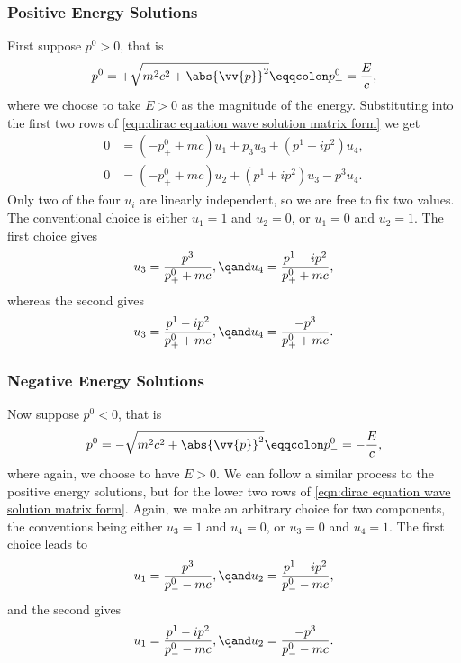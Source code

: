 \documentclass[fleqn]{NotesClass}
\begin{document}
\begin{appendices}
        \subsubsection{Positive Energy Solutions}
        First suppose \(p^0 > 0\), that is
        \begin{equation}
            p^0 = +\sqrt{m^2c^2 + \abs{\vv{p}}^2} \eqqcolon p^0_+ = \frac{E}{c},
        \end{equation}
        where we choose to take \(E > 0\) as the magnitude of the energy.
        Substituting into the first two rows of \cref{eqn:dirac equation wave solution matrix form} we get
        \begin{align}
            0 &= (-p_+^0 + mc)u_1 + p_3u_3 + (p^1 - ip^2)u_4,\\
            0 &= (-p_+^0 + mc)u_2 + (p^1 + ip^2)u_3 - p^3 u_4.
        \end{align}
        Only two of the four \(u_i\) are linearly independent, so we are free to fix two values.
        The conventional choice is either \(u_1 = 1\) and \(u_2 = 0\), or \(u_1 = 0\) and \(u_2 = 1\).
        The first choice gives
        \begin{equation}
            u_3 = \frac{p^3}{p_+^0 + mc}, \qand u_4 = \frac{p^1 + ip^2}{p_+^0 + mc},
        \end{equation}
        whereas the second gives
        \begin{equation}
            u_3 = \frac{p^1 - ip^2}{p_+^0 + mc}, \qand u_4 = \frac{-p^3}{p_+^0 + mc}.
        \end{equation}
        
        \subsubsection{Negative Energy Solutions}
        Now suppose \(p^0 < 0\), that is
        \begin{equation}
            p^0 = -\sqrt{m^2c^2 + \abs{\vv{p}}^2} \eqqcolon p^0_- = -\frac{E}{c},
        \end{equation}
        where again, we choose to have \(E > 0\).
        We can follow a similar process to the positive energy solutions, but for the lower two rows of \cref{eqn:dirac equation wave solution matrix form}.
        Again, we make an arbitrary choice for two components, the conventions being either \(u_3 = 1\) and \(u_4 = 0\), or \(u_3 = 0\) and \(u_4 = 1\).
        The first choice leads to 
        \begin{equation}
            u_1 = \frac{p^3}{p^0_- - mc}, \qand u_2 = \frac{p^1 + ip^2}{p^0_- - mc},
        \end{equation}
        and the second gives
        \begin{equation}
            u_1 = \frac{p^1 - ip^2}{p^0_- - mc}, \qand u_2 = \frac{-p^3}{p^0_- - mc}.
        \end{equation}
        

\end{appendices}
\end{document}
